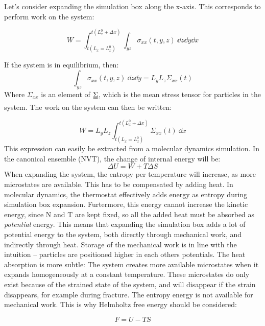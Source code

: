 Let's consider expanding the simulation box along the x-axis. This corresponds to perform work on the system:

\begin{equation}
	W = \int_{t(L_x = L_x^0)}^{t(L_x^0 + \Delta x)} \int_{yz} \sigma_{xx} (t, y, z) \ \dd z \dd y \dd x
\end{equation}

If the system is in equilibrium, then:
\begin{equation}
\int_{yz} \sigma_{xx} (t, y, z) \ \dd z \dd y = L_yL_z\Sigma_{xx}(t)	
\end{equation}
Where $\Sigma_{xx}$ is an element of $\uuline \Sigma$, which is the mean stress tensor for particles in the system. The work on the system can then be written:

\begin{equation}
	W = L_y L_z \int_{t(L_x = L_x^0)}^{t(L_x^0 + \Delta x)} \Sigma_{xx}(t) \ \dd x
	\label{eq:work_expansion}
\end{equation}
This expression can easily be extracted from a molecular dynamics simulation.
In the canonical ensemble (NVT), the change of internal energy will be:
\begin{equation}
	\Delta U = W + T\Delta S
\end{equation}
When expanding the system, the entropy per temperature will increase, as more microstates are available. This has to be compensated by adding heat. In molecular dynamics, the thermostat effectively adds energy as entropy during simulation box expansion. Furtermore, this energy cannot increase the kinetic energy, since N and T are kept fixed, so all the added heat must be absorbed as \emph{potential} energy. This means that expanding the simulation box adds a lot of potential energy to the system, both directly through mechanical work, and indirectly through heat. Storage of the mechanical work is in line with the intuition -- particles are positioned higher in each others potentials. The heat absorption is more subtle: The system creates more available microstates when it expands homogeneously at a constant temperature. These microstates do only exist because of the strained state of the system, and will disappear if the strain disappears, for example during fracture. The entropy energy is not available for mechanical work. This is why Helmholtz free energy should be considered:

\begin{equation}
	F = U - TS
\end{equation}

